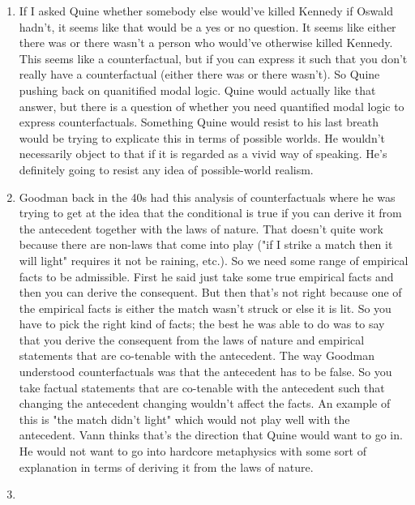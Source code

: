 \documentclass[12pt]{article}
\theoremstyle{definition}
\begin{document}
\begin{enumerate}
    \itemsep0em 
    \item
        If I asked Quine whether somebody else would've killed Kennedy if
        Oswald hadn't, it seems like that would be a yes or no question. It
        seems like either there was or there wasn't a person who would've
        otherwise killed Kennedy. This seems like a counterfactual, but if you
        can express it such that you don't really have a counterfactual (either
        there was or there wasn't). So Quine pushing back on quanitified modal
        logic. Quine would actually like that answer, but there is a question
        of whether you need quantified modal logic to express counterfactuals.
        Something Quine would resist to his last breath would be trying to
        explicate this in terms of possible worlds. He wouldn't necessarily
        object to that if it is regarded as a vivid way of speaking. He's
        definitely going to resist any idea of possible-world realism.
    \item
        Goodman back in the 40s had this analysis of counterfactuals where he
        was trying to get at the idea that the conditional is true if you can
        derive it from the antecedent together with the laws of nature. That
        doesn't quite work because there are non-laws that come into play ("if
        I strike a match then it will light" requires it not be raining, etc.).
        So we need some range of empirical facts to be admissible. First he
        said just take some true empirical facts and then you can derive the
        consequent. But then that's not right because one of the empirical
        facts is either the match wasn't struck or else it is lit. So you have
        to pick the right kind of facts; the best he was able to do was to say
        that you derive the consequent from the laws of nature and empirical
        statements that are co-tenable with the antecedent. The way Goodman
        understood counterfactuals was that the antecedent has to be false. So
        you take factual statements that are co-tenable with the antecedent
        such that changing the antecedent changing wouldn't affect the facts.
        An example of this is "the match didn't light" which would not play
        well with the antecedent. Vann thinks that's the direction that Quine
        would want to go in. He would not want to go into hardcore metaphysics
        with some sort of explanation in terms of deriving it from the laws of
        nature. 
    \item

\end{enumerate}
\end{document}
